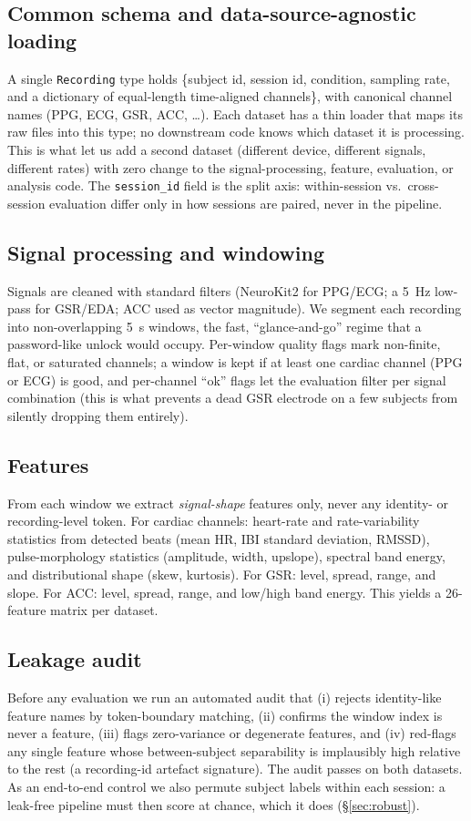 \documentclass[11pt]{article}
\begin{document}
\subsection{Common schema and data-source-agnostic loading}
A single \texttt{Recording} type holds \{subject id, session id, condition, sampling rate,
and a dictionary of equal-length time-aligned channels\}, with canonical channel names
(PPG, ECG, GSR, ACC, \dots). Each dataset has a thin loader that maps its raw files into this
type; no downstream code knows which dataset it is processing. This is what let us add a
second dataset (different device, different signals, different rates) with zero change to the
signal-processing, feature, evaluation, or analysis code. The \texttt{session\_id} field is the
split axis: within-session vs.\ cross-session evaluation differ only in how sessions are
paired, never in the pipeline.

\subsection{Signal processing and windowing}
Signals are cleaned with standard filters (NeuroKit2 for PPG/ECG; a \SI{5}{\hertz} low-pass for
GSR/EDA; ACC used as vector magnitude). We segment each recording into non-overlapping
\SI{5}{\second} windows, the fast, ``glance-and-go'' regime that a password-like unlock would
occupy. Per-window quality flags mark non-finite, flat, or saturated channels; a window is kept
if at least one cardiac channel (PPG or ECG) is good, and per-channel ``ok'' flags let the
evaluation filter per signal combination (this is what prevents a dead GSR electrode on a few
subjects from silently dropping them entirely).

\subsection{Features}
From each window we extract \emph{signal-shape} features only, never any identity- or
recording-level token. For cardiac channels: heart-rate and rate-variability statistics from
detected beats (mean HR, IBI standard deviation, RMSSD), pulse-morphology statistics
(amplitude, width, upslope), spectral band energy, and distributional shape (skew, kurtosis).
For GSR: level, spread, range, and slope. For ACC: level, spread, range, and low/high band
energy. This yields a 26-feature matrix per dataset.

\subsection{Leakage audit}
Before any evaluation we run an automated audit that (i) rejects identity-like feature names
by token-boundary matching, (ii) confirms the window index is never a feature, (iii) flags
zero-variance or degenerate features, and (iv) red-flags any single feature whose
between-subject separability is implausibly high relative to the rest (a recording-id artefact
signature). The audit passes on both datasets. As an end-to-end control we also permute
subject labels within each session: a leak-free pipeline must then score at chance, which it
does (\S\ref{sec:robust}).
\end{document}
